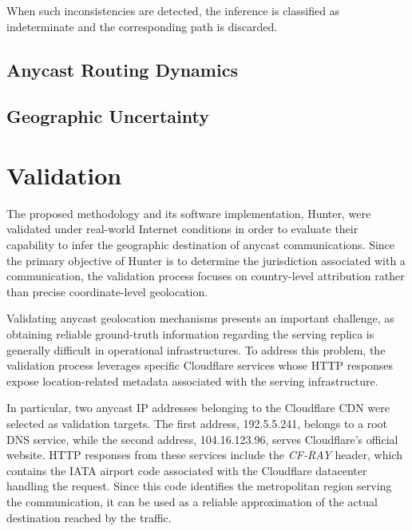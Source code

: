 When such inconsistencies are detected, the inference is classified as indeterminate and the corresponding path is discarded.

\subsection{Anycast Routing Dynamics}
\label{sc:hunter_limitations_anycast_routing_dynamics}

\subsection{Geographic Uncertainty}
\label{sc:hunter_limitations_geographic_uncertainty}

\section{Validation}
\label{sc:hunter_validation}


The proposed methodology and its software implementation, Hunter, were validated under real-world Internet conditions in order to evaluate their capability to infer the geographic destination of anycast communications. Since the primary objective of Hunter is to determine the jurisdiction associated with a communication, the validation process focuses on country-level attribution rather than precise coordinate-level geolocation.

Validating anycast geolocation mechanisms presents an important challenge, as obtaining reliable ground-truth information regarding the serving replica is generally difficult in operational infrastructures. To address this problem, the validation process leverages specific Cloudflare services whose HTTP responses expose location-related metadata associated with the serving infrastructure.

In particular, two anycast IP addresses belonging to the Cloudflare CDN were selected as validation targets. The first address, 192.5.5.241, belongs to a root DNS service, while the second address, 104.16.123.96, serves Cloudflare's official website. HTTP responses from these services include the \textit{CF-RAY} header, which contains the IATA airport code associated with the Cloudflare datacenter handling the request. Since this code identifies the metropolitan region serving the communication, it can be used as a reliable approximation of the actual destination reached by the traffic.

